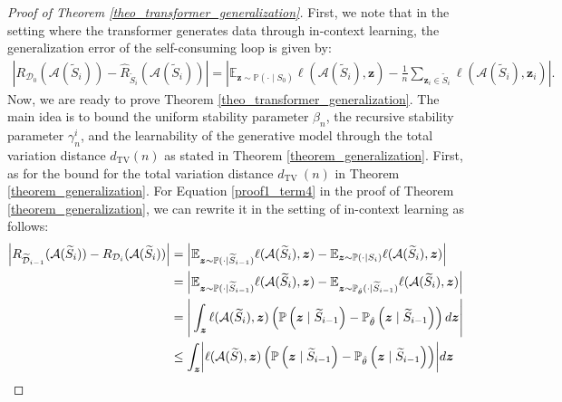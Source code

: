  \begin{proof}[Proof of Theorem \ref{theo_transformer_generalization}] First, we note that in the setting where the transformer generates data through in-context learning, the generalization error of the self-consuming loop is given by:
 \begin{align}
\left|R_{\mathcal{D}_0}(\mathcal{A}(\widetilde{S}_i))-\widehat{R}_{\widetilde{S}_i}(\mathcal{A}(\widetilde{S}_i))\right|=\left|\mathbb{E}_{\boldsymbol{z}\sim\mathbb{P}(\cdot \mid S_0)} \ell(\mathcal{A}(\widetilde{S}_i), \boldsymbol{z})-\frac{1}{n} \sum_{\boldsymbol{z}_i \in \widetilde{S}_{i}}\ell(\mathcal{A}(\widetilde{S}_i), \boldsymbol{z}_i)\right|.
 \end{align}
 Now, we are ready to prove Theorem \ref{theo_transformer_generalization}. The main idea is to bound the uniform stability parameter $\beta_n$, the recursive stability parameter $\gamma_n^i$, and the learnability of the generative model through the total variation distance $d_{\mathrm{TV}}(n)$ as stated in Theorem \ref{theorem_generalization}. First, as for the bound for the total variation distance $d_{\text {TV }}(n)$ in Theorem \ref{theorem_generalization}. For Equation \ref{proof1_term4} in the proof of Theorem \ref{theorem_generalization}, we can rewrite it in the setting of in-context learning as follows:
\begin{align}
\left|R_{\widetilde{\mathcal{D}}_{i-1}}(\mathcal{A}(\widetilde{S}_i))-R_{\mathcal{D}_{i}}(\mathcal{A}(\widetilde{S}_i))\right|
&=\left|\mathbb{E}_{\boldsymbol{z}\sim\mathbb{P}(\cdot \mid \widetilde{S}_{i-1})} \ell(\mathcal{A}(\widetilde{S}_i), \boldsymbol{z}) -\mathbb{E}_{\boldsymbol{z}\sim\mathbb{P}(\cdot \mid S_{i})} \ell(\mathcal{A}(\widetilde{S}_i), \boldsymbol{z})\right| \notag \\
&=\left|\mathbb{E}_{\boldsymbol{z}\sim\mathbb{P}(\cdot \mid \widetilde{S}_{i-1})} \ell(\mathcal{A}(\widetilde{S}_i), \boldsymbol{z}) -\mathbb{E}_{\boldsymbol{z}\sim\mathbb{P}_{\hat{\theta}}(\cdot \mid \widetilde{S}_{i-1})} \ell(\mathcal{A}(\widetilde{S}_i), \boldsymbol{z})\right| \notag \\
&=\Bigg|\int_{\boldsymbol{z}}\ell(\mathcal{A}(\widetilde{S}_i),\boldsymbol{z})\left(\mathbb{P}\left(\boldsymbol{z} \mid \widetilde{S}_{i-1}\right)-\mathbb{P}_{\hat{\theta}}\left(\boldsymbol{z} \mid \widetilde{S}_{i-1}\right)\right)d\boldsymbol{z}\Bigg| \notag \\
&\leq\int_{\boldsymbol{z}}\biggl|\ell(\mathcal{A}(\widetilde{S}),\boldsymbol{z})\left(\mathbb{P}\left(\boldsymbol{z} \mid \widetilde{S}_{i-1}\right)-\mathbb{P}_{\hat{\theta}}\left(\boldsymbol{z} \mid \widetilde{S}_{i-1}\right)\right)\biggr| d\boldsymbol{z} \notag\\

\end{align}
\end{proof}

